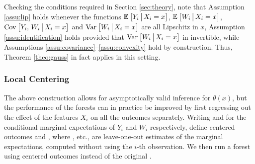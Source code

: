 \documentclass[aos]{imsart}
\theoremstyle{plain}
\theoremstyle{definition}
\theoremstyle{remark}
\begin{document}
\begin{CJK}{UTF8}{gbsn}
Checking the conditions required in Section \ref{sec:theory}, note that
Assumption \ref{assu:lip} holds whenever the functions $\mathbb{E}_{}\left[Y_i \,\big|\, X_i = x\right]$, 
$\mathbb{E}_{}\left[W_i \,\big|\, X_i = x\right]$, $\operatorname{Cov}_{}\left[Y_i, \, W_i \,\big|\, X_i = x\right]$ and $\operatorname{Var}_{}\left[W_i \,\big|\, X_i = x\right]$
are all Lipschitz in $x$, Assumption \ref{assu:identification} holds provided that
$\operatorname{Var}_{}\left[W_i \,\big|\, X_i = x\right]$ in invertible, while Assumptions \ref{assu:covariance}--\ref{assu:convexity}
hold by construction. Thus, Theorem \ref{theo:gauss} in fact applies in this setting.

\subsubsection{Local Centering}
\label{sec:precompute}

The above construction allows for asymptotically valid inference for $\theta(x)$,
but the performance of the forests can in practice
be improved by first regressing out the effect of the features $X_i$ on all the
outcomes separately. Writing
 and 
for the conditional marginal expectations of $Y_i$ and $W_i$ respectively,
define centered outcomes
 and ,
where , etc., are leave-one-out estimates of the marginal expectations,
computed without using the $i$-th observation.
We then run a forest using centered outcomes
 instead of the original
.


\end{CJK}
\end{document}
